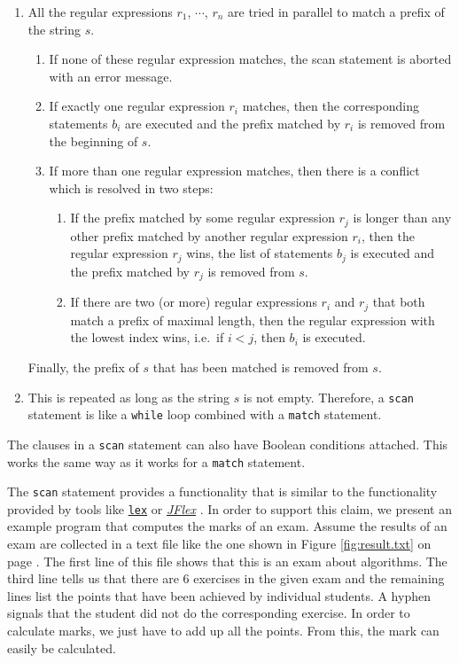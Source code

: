 \begin{enumerate}
\item All the regular expressions $r_1$, $\cdots$, $r_n$ are tried in parallel to match a
      prefix of the string $s$.
      \begin{enumerate}
      \item If none of these regular expression matches, the scan statement is aborted
            with an error message.
      \item If exactly one regular expression $r_i$ matches, then the corresponding
            statements $b_i$ are executed and the prefix matched by $r_i$ is removed from
            the beginning of $s$.
      \item If more than one regular expression matches, then there is a conflict which
            is resolved in two steps:
            \begin{enumerate}
            \item If the prefix matched by some regular expression $r_j$ is longer
                  than any other prefix matched by another regular expression $r_i$,
                  then the regular expression $r_j$ wins, the list of statements $b_j$ is
                  executed and the prefix matched by $r_j$ is removed from $s$.
            \item If there are two (or more) regular expressions $r_i$ and $r_j$ that both
                  match a prefix of maximal length, then the regular expression with the
                  lowest index wins, i.e.~if $i < j$, then $b_i$ is executed.
            \end{enumerate}
      \end{enumerate}
      Finally, the prefix of $s$ that has been matched is removed from $s$.
\item This is repeated as long as the string $s$ is not empty.  Therefore, a \texttt{scan}
      statement is like a \texttt{while} loop combined with a \texttt{match} statement.
\end{enumerate}
The clauses in a \texttt{scan} statement can also have Boolean conditions attached.  This
works the same way as it works for a \texttt{match} statement.

The \texttt{scan} statement provides a functionality that is similar to the functionality
provided  by tools like 
\href{http://en.wikipedia.org/wiki/Lex_(software)}{\texttt{lex}} \cite{lesk:1975} or
\href{http://jflex.de}{\textsl{JFlex}} \cite{klein:2009}. 
In order to support this claim, we present an example program that computes the marks of
an exam.  Assume the results of an exam are collected in a text file like the one shown in
Figure \ref{fig:result.txt} on page \pageref{fig:result.txt}.  The first line of this file shows that this is an exam about
algorithms.  The third line tells us
that there are 6 exercises in the given exam and the remaining lines list the points that
have been achieved by individual students.  A hyphen signals that the student did not do
the corresponding exercise.  In order to calculate marks, we just have to add up all the points.  From
this, the mark can easily be calculated.

